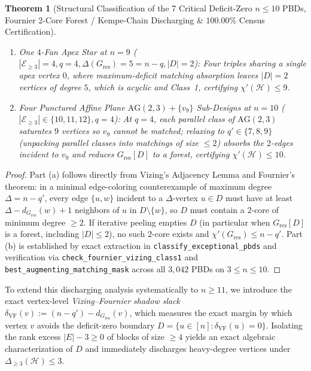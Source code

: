 \documentclass[11pt,reqno]{amsart}
\newtheorem{theorem}{Theorem}[section]
\theoremstyle{definition}
\theoremstyle{remark}
\begin{document}
\begin{theorem}[Structural Classification of the 7 Critical Deficit-Zero $n \le 10$ PBDs, Fournier 2-Core Forest / Kempe-Chain Discharging \& $100.00\%$ Census Certification]
\begin{enumerate}
\begin{enumerate}
    \item \emph{One $4$-Fan Apex Star at $n = 9$ ($|\mathcal{E}_{\ge 3}| = 4, q = 4, \Delta(G_{\mathrm{res}}) = 5 = n - q, |D| = 2$):} Four triples sharing a single apex vertex $0$, where maximum-deficit matching absorption leaves $|D| = 2$ vertices of degree $5$, which is acyclic and Class~1, certifying $\chi'(\mathcal{H}) \le 9$.
    \item \emph{Four Punctured Affine Plane $\mathrm{AG}(2,3) + \{v_9\}$ Sub-Designs at $n = 10$ ($|\mathcal{E}_{\ge 3}| \in \{10, 11, 12\}, q = 4$):} At $q = 4$, each parallel class of $\mathrm{AG}(2,3)$ saturates $9$ vertices so $v_9$ cannot be matched; relaxing to $q' \in \{7, 8, 9\}$ (unpacking parallel classes into matchings of size $\le 2$) absorbs the $2$-edges incident to $v_9$ and reduces $G_{\mathrm{res}}[D]$ to a forest, certifying $\chi'(\mathcal{H}) \le 10$.
  \end{enumerate}
\end{enumerate}
\end{theorem}

\begin{proof}
Part (a) follows directly from Vizing's Adjacency Lemma \cite{Vizing1964} and Fournier's theorem: in a minimal edge-coloring counterexample of maximum degree $\Delta = n - q'$, every edge $\{u, w\}$ incident to a $\Delta$-vertex $u \in D$ must have at least $\Delta - d_{G_{\mathrm{res}}}(w) + 1$ neighbors of $u$ in $D \setminus \{w\}$, so $D$ must contain a $2$-core of minimum degree $\ge 2$. If iterative peeling empties $D$ (in particular when $G_{\mathrm{res}}[D]$ is a forest, including $|D| \le 2$), no such $2$-core exists and $\chi'(G_{\mathrm{res}}) \le n - q'$. Part (b) is established by exact extraction in \texttt{classify\_exceptional\_pbds} and verification via \texttt{check\_fournier\_vizing\_class1} and \texttt{best\_augmenting\_matching\_mask} across all $3{,}042$ PBDs on $3 \le n \le 10$.
\end{proof}

To extend this discharging analysis systematically to $n \ge 11$, we introduce the exact vertex-level \emph{Vizing--Fournier shadow slack} $\delta_{\mathrm{VF}}(v) := (n - q') - d_{G_{\mathrm{res}}}(v)$, which measures the exact margin by which vertex $v$ avoids the deficit-zero boundary $D = \{u \in [n] : \delta_{\mathrm{VF}}(u) = 0\}$. Isolating the rank excess $|E| - 3 \ge 0$ of blocks of size $\ge 4$ yields an exact algebraic characterization of $D$ and immediately discharges heavy-degree vertices under $\Delta_{\ge 3}(\mathcal{H}) \le 3$.
\end{document}

